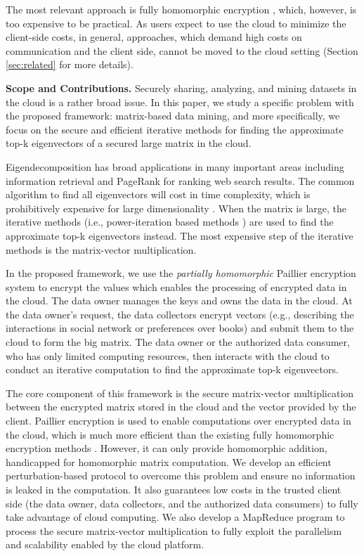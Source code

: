 \documentclass[10pt, conference, compsocconf]{IEEEtran}
\begin{document}
The most relevant approach is fully homomorphic encryption \cite{gentry09,naehrig11}, which, however, is too expensive to be practical. As users expect to use the cloud to minimize the client-side costs, in general, approaches, which demand high costs on communication and the client side, cannot be moved to the cloud setting (Section \ref{sec:related} for more details).   

\textbf{Scope and Contributions.} Securely sharing, analyzing, and mining datasets in the cloud is a rather broad issue. In this paper, we study a specific problem with the proposed framework: matrix-based data mining, and more specifically, we focus on the secure and efficient iterative methods for finding the approximate top-k eigenvectors of a secured large matrix in the cloud. 

Eigendecomposition \cite{saad11} has broad applications in many important areas including information retrieval \cite{deerwester90} and PageRank \cite{brin98} for ranking web search results. The common algorithm to find all eigenvectors will cost  in time complexity, which is prohibitively expensive for large dimensionality . When the matrix is large, the iterative methods (i.e., power-iteration based methods \cite{arnoldi51,cullum85}) are used to find the approximate top-k eigenvectors instead. The most expensive step of the iterative methods is the matrix-vector multiplication.    



In the proposed framework, we use the \emph{partially homomorphic} Paillier encryption system \cite{paillier99} to encrypt the values which enables the processing of encrypted data in the cloud. The data owner manages the keys and owns the data in the cloud. At the data owner's request, the data collectors encrypt vectors (e.g., describing the interactions in social network or preferences over books) and submit them to the cloud to form the big matrix. The data owner or the authorized data consumer, who has only limited computing resources, then interacts with the cloud to conduct an iterative computation to find the approximate top-k eigenvectors. 

The core component of this framework is the secure matrix-vector multiplication between the encrypted matrix stored in the cloud and the vector provided by the client. Paillier encryption is used to enable computations over encrypted data in the cloud, which is much more efficient than the existing fully homomorphic encryption methods \cite{gentry09}. However, it can only provide homomorphic addition, handicapped for homomorphic matrix computation. We develop an efficient perturbation-based protocol to overcome this problem and ensure no information is leaked in the computation. It also guarantees low costs  in the trusted client side (the data owner, data collectors, and the authorized data consumers) to fully take advantage of cloud computing. We also develop a MapReduce program to process the secure matrix-vector multiplication to fully exploit the parallelism and scalability enabled by the cloud platform. 
\end{document}
